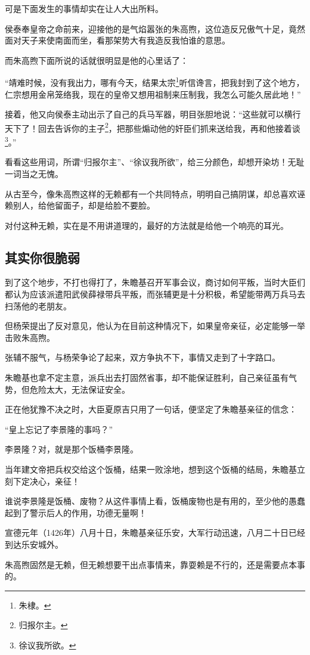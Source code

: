 \begin{multicols}{\theparacolNo}
可是下面发生的事情却实在让人大出所料。

侯泰奉皇帝之命前来，迎接他的是气焰嚣张的朱高煦，这位造反兄傲气十足，竟然面对天子来使南面而坐，看那架势大有我造反我怕谁的意思。

而朱高煦下面所说的话就很明显是他的心里话了：

“靖难时候，没有我出力，哪有今天，结果太宗\footnote{朱棣。}听信谗言，把我封到了这个地方，仁宗想用金帛笼络我，现在的皇帝又想用祖制来压制我，我怎么可能久居此地！”

接着，他又向侯泰主动出示了自己的兵马军器，明目张胆地说：“这些就可以横行天下了！回去告诉你的主子\footnote{归报尔主。}，把那些煽动他的奸臣们抓来送给我，再和他接着谈\footnote{徐议我所欲。}。”

看看这些用词，所谓“归报尔主”、“徐议我所欲”，给三分颜色，却想开染坊！无耻一词当之无愧。

从古至今，像朱高煦这样的无赖都有一个共同特点，明明自己搞阴谋，却总喜欢诬赖别人，给他留面子，却是给脸不要脸。

对付这种无赖，实在是不用讲道理的，最好的方法就是给他一个响亮的耳光。

\subsection{其实你很脆弱}
到了这个地步，不打也得打了，朱瞻基召开军事会议，商讨如何平叛，当时大臣们都认为应该派遣阳武侯薛禄带兵平叛，而张辅更是十分积极，希望能带两万兵马去扫荡他的老朋友。

但杨荣提出了反对意见，他认为在目前这种情况下，如果皇帝亲征，必定能够一举击败朱高煦。

张辅不服气，与杨荣争论了起来，双方争执不下，事情又走到了十字路口。

朱瞻基也拿不定主意，派兵出去打固然省事，却不能保证胜利，自己亲征虽有气势，但危险太大，无法保证安全。

正在他犹豫不决之时，大臣夏原吉只用了一句话，便坚定了朱瞻基亲征的信念：

“皇上忘记了李景隆的事吗？”

李景隆？对，就是那个饭桶李景隆。

当年建文帝把兵权交给这个饭桶，结果一败涂地，想到这个饭桶的结局，朱瞻基立刻下定决心，亲征！

谁说李景隆是饭桶、废物？从这件事情上看，饭桶废物也是有用的，至少他的愚蠢起到了警示后人的作用，功德无量啊！

宣德元年（1426年）八月十日，朱瞻基亲征乐安，大军行动迅速，八月二十日已经到达乐安城外。

朱高煦固然是无赖，但无赖想要干出点事情来，靠耍赖是不行的，还是需要点本事的。


\end{multicols}
